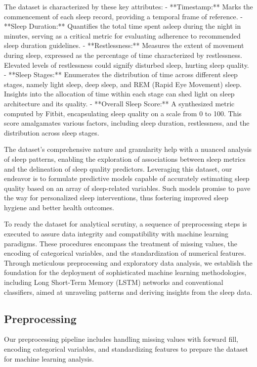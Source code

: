 \documentclass[10pt]{extarticle}
\begin{document}
The dataset is characterized by these key attributes:
- **Timestamp:** Marks the commencement of each sleep record, providing a temporal frame of reference.
- **Sleep Duration:** Quantifies the total time spent asleep during the night in minutes, serving as a critical metric for evaluating adherence to recommended sleep duration guidelines.
- **Restlessness:** Measures the extent of movement during sleep, expressed as the percentage of time characterized by restlessness. Elevated levels of restlessness could signify disturbed sleep, hurting sleep quality.
- **Sleep Stages:** Enumerates the distribution of time across different sleep stages, namely light sleep, deep sleep, and REM (Rapid Eye Movement) sleep. Insights into the allocation of time within each stage can shed light on sleep architecture and its quality.
- **Overall Sleep Score:** A synthesized metric computed by Fitbit, encapsulating sleep quality on a scale from 0 to 100. This score amalgamates various factors, including sleep duration, restlessness, and the distribution across sleep stages.

The dataset's comprehensive nature and granularity help with a nuanced analysis of sleep patterns, enabling the exploration of associations between sleep metrics and the delineation of sleep quality predictors. Leveraging this dataset, our endeavor is to formulate predictive models capable of accurately estimating sleep quality based on an array of sleep-related variables. Such models promise to pave the way for personalized sleep interventions, thus fostering improved sleep hygiene and better health outcomes.

To ready the dataset for analytical scrutiny, a sequence of preprocessing steps is executed to assure data integrity and compatibility with machine learning paradigms. These procedures encompass the treatment of missing values, the encoding of categorical variables, and the standardization of numerical features. Through meticulous preprocessing and exploratory data analysis, we establish the foundation for the deployment of sophisticated machine learning methodologies, including Long Short-Term Memory (LSTM) networks and conventional classifiers, aimed at unraveling patterns and deriving insights from the sleep data.

\subsection{Preprocessing}

Our preprocessing pipeline includes handling missing values with forward fill, encoding categorical variables, and standardizing features to prepare the dataset for machine learning analysis.
\end{document}
